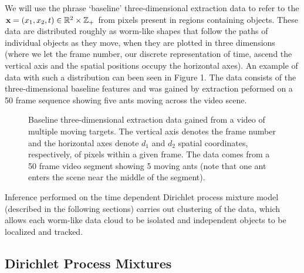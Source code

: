 \documentclass{article}
\begin{document}
We will use the phrase `baseline' three-dimensional extraction data to refer to the $\bold{x} = ( x_{1}, x_{2}, t ) \in \mathbb{R}^{2} \times \mathbb{Z}_{+}$ from pixels present in regions containing objects. These data are distributed roughly as worm-like shapes that follow the paths of individual objects as they move, when they are plotted in three dimensions (where we let the frame number, our discrete representation of time, ascend the vertical axis and the spatial positions occupy the horizontal axes). An example of data with such a distribution can been seen in Figure 1. The data consists of the three-dimensional baseline features and was gained by extraction peformed on a 50 frame sequence showing five ants moving across the video scene.
\begin{figure}[h]
        \caption{\label{Figure 1:} Baseline three-dimensional extraction data gained from a video of multiple moving targets. The vertical axis denotes the frame number and the horizontal axes denote $d_{1}$ and $d_{2}$ spatial coordinates, respectively, of pixels within a given frame. The data comes from a 50 frame video segment showing 5 moving ants (note that one ant enters the scene near the middle of the segment).}
\end{figure}
Inference performed on the time dependent Dirichlet process mixture model (described in the following sections) carries out clustering of the data, which allows each worm-like data cloud to be isolated and independent objects to be localized and tracked.






\subsection{Dirichlet Process Mixtures}
\end{document}
